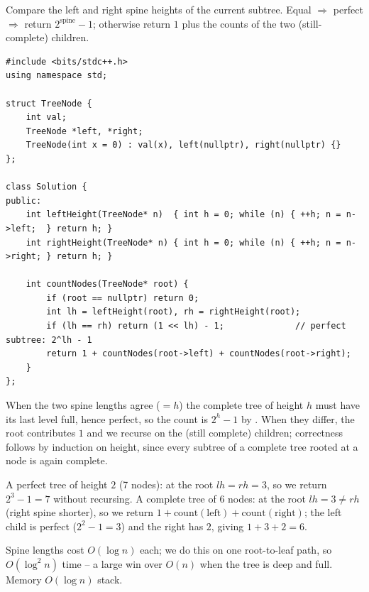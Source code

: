 Compare the left and right spine heights of the current subtree. Equal $\Rightarrow$
perfect $\Rightarrow$ return $2^{\text{spine}}-1$; otherwise return $1$ plus the counts of
the two (still-complete) children.
\begin{lstlisting}[caption={Count Complete Tree Nodes (LeetCode 222)}, label={lst:c01-count-nodes}]
#include <bits/stdc++.h>
using namespace std;

struct TreeNode {
    int val;
    TreeNode *left, *right;
    TreeNode(int x = 0) : val(x), left(nullptr), right(nullptr) {}
};

class Solution {
public:
    int leftHeight(TreeNode* n)  { int h = 0; while (n) { ++h; n = n->left;  } return h; }
    int rightHeight(TreeNode* n) { int h = 0; while (n) { ++h; n = n->right; } return h; }

    int countNodes(TreeNode* root) {
        if (root == nullptr) return 0;
        int lh = leftHeight(root), rh = rightHeight(root);
        if (lh == rh) return (1 << lh) - 1;              // perfect subtree: 2^lh - 1
        return 1 + countNodes(root->left) + countNodes(root->right);
    }
};
\end{lstlisting}

\begin{proofbox}
When the two spine lengths agree ($=h$) the complete tree of height $h$ must have its last
level full, hence perfect, so the count is $2^{h}-1$ by . When
they differ, the root contributes $1$ and we recurse on the (still complete) children;
correctness follows by induction on height, since every subtree of a complete tree rooted
at a node is again complete.
\end{proofbox}

\begin{tracebox}
A perfect tree of height $2$ (7 nodes): at the root $lh=rh=3$, so we return $2^3-1=7$
without recursing. A complete tree of $6$ nodes: at the root $lh=3\ne rh$ (right spine
shorter), so we return $1+\text{count}(\text{left})+\text{count}(\text{right})$; the left
child is perfect ($2^2-1=3$) and the right has $2$, giving $1+3+2=6$.
\end{tracebox}

\begin{complexitybox}
Spine lengths cost $O(\log n)$ each; we do this on one root-to-leaf path, so $O(\log^2 n)$
time -- a large win over $O(n)$ when the tree is deep and full. Memory $O(\log n)$ stack.
\end{complexitybox}

